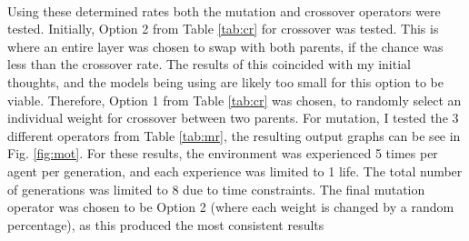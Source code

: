 \paragraph{}


Using these determined rates both the mutation and crossover operators were tested. Initially, Option 2 from Table \ref{tab:cr} for crossover was tested. This is where an entire layer was chosen to swap with both parents, if the chance was less than the crossover rate. The results of this coincided with my initial thoughts, and the models being using are likely too small for this option to be viable. Therefore, Option 1 from Table \ref{tab:cr} was chosen, to randomly select an individual weight for crossover between two parents. For mutation, I tested the 3 different operators from Table \ref{tab:mr}, the resulting output graphs can be see in Fig. \ref{fig:mot}. For these results, the environment was experienced 5 times per agent per generation, and each experience was limited to 1 life. The total number of generations was limited to 8 due to time constraints. The final mutation operator was chosen to be Option 2 (where each weight is changed by a random percentage), as this produced the most consistent results

